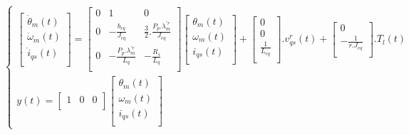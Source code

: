 \documentclass{article}
\begin{document}
\begin{enumerate}[label=\roman*.]
    \begin{equation}
        \begin{cases}
            \begin{bmatrix}
                \dot{\theta}_{m}(t)\\
                \dot{\omega}_{m}(t)\\
                \dot{i}_{qs}(t)\\
            \end{bmatrix} =
            \begin{bmatrix}
                0 & 1 & 0\\
                0 & -\frac{b_{eq}}{J_{eq}} & \frac{3}{2}.\frac{P_{p}.\lambda_{m}^{\prime r}}{J_{eq}}\\
                0 & -\frac{P_{p}.\lambda_{m}^{\prime r}}{L_{q}} & -\frac{R_{s}}{L_{q}}\\
            \end{bmatrix}
            \begin{bmatrix}
                {\theta}_{m}(t)\\
                {\omega}_{m}(t)\\
                {i}_{qs}(t)\\
            \end{bmatrix} +
            \begin{bmatrix}
                0\\
                0\\
                \frac{1}{L_{eq}}\\
            \end{bmatrix} .v_{qs}^r(t) +
            \begin{bmatrix}
                0\\
                -\frac{1}{r.J_{eq}}\\
            \end{bmatrix} .T_{l}(t)\\
            y(t) =
            \begin{bmatrix}
                1 & 0 & 0\\
            \end{bmatrix}
            \begin{bmatrix}
                {\theta}_{m}(t)\\
                {\omega}_{m}(t)\\
                {i}_{qs}(t)\\
            \end{bmatrix}
        \end{cases}
    \end{equation}


\end{enumerate}
\end{document}
